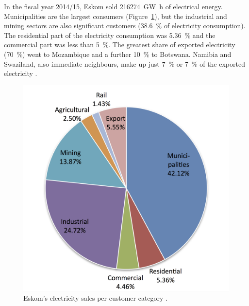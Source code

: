 In the fiscal year 2014/15, Eskom sold \SI{216274}{\giga\watt\hour} of electrical energy. Municipalities are the largest consumers (Figure~\ref{ElectricityShare}), but the industrial and mining sectors are also significant customers (\SI{38.6}{\percent} of electricity consumption). The residential part of the electricity consumption was \SI{5.36}{\percent} and the commercial part was less than \SI{5}{\percent}. The greatest share of exported electricity (\SI{70}{\percent}) went to Mozambique and a further \SI{10}{\percent} to Botswana. Namibia and Swaziland, also immediate neighbours, make up just \SI{7}{\percent} or \SI{7}{\percent} of the exported electricity \cite{Eskom2015b}.

\begin{figure}[!h] 
\centering
\includegraphics[width=0.4\linewidth]{FIG/ElectricityShare}
\caption[Eskom's electricity sales per customer category.]{Eskom's electricity sales per customer category \cite{Eskom2015b}.}\label{ElectricityShare}
\end{figure}
\pagebreak
